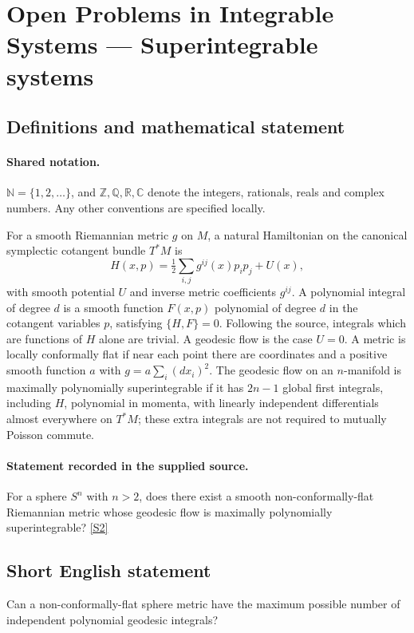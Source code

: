 \documentclass[11pt]{article}
\newcommand{\sref}[2]{\hyperlink{source:#1:#2}{[S#2]}}
\begin{document}
\section{Open Problems in Integrable Systems — Superintegrable systems}\label{statement}

\subsection{Definitions and mathematical statement}

\paragraph{Shared notation.}$\mathbb N=\{1,2,\ldots\}$, and $\mathbb Z,\mathbb Q,\mathbb R,\mathbb C$ denote the integers, rationals, reals and complex numbers. Any other conventions are specified locally.


For a smooth Riemannian metric $g$ on $M$, a natural Hamiltonian on the canonical symplectic cotangent bundle $T^*M$ is \[H(x,p)=\tfrac12\sum_{i,j}g^{ij}(x)p_ip_j+U(x),\] with smooth potential $U$ and inverse metric coefficients $g^{ij}$. A polynomial integral of degree $d$ is a smooth function $F(x,p)$ polynomial of degree $d$ in the cotangent variables $p$, satisfying $\{H,F\}=0$. Following the source, integrals which are functions of $H$ alone are trivial. A geodesic flow is the case $U=0$. A metric is locally conformally flat if near each point there are coordinates and a positive smooth function $a$ with $g=a\sum_i(dx_i)^2$. The geodesic flow on an $n$-manifold is maximally polynomially superintegrable if it has $2n-1$ global first integrals, including $H$, polynomial in momenta, with linearly independent differentials almost everywhere on $T^*M$; these extra integrals are not required to mutually Poisson commute.
\paragraph{Statement recorded in the supplied source.}
For a sphere $S^n$ with $n>2$, does there exist a smooth non-conformally-flat Riemannian metric whose geodesic flow is maximally polynomially superintegrable? \sref{statement}{2}
\subsection{Short English statement}
Can a non-conformally-flat sphere metric have the maximum possible number of independent polynomial geodesic integrals?
\end{document}
